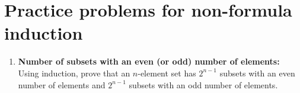 \section{Practice problems for non-formula induction}\label{practice_non_formula}

\begin{enumerate}


\item \textbf{Number of subsets with an even (or odd) number of elements:}
Using induction, prove that an $n$-element set  has $2^{n-1}$ subsets
with an even number of elements and $2^{n-1}$ subsets with an odd number
of elements.

%
%
%
%
%
%
%
%
%
%
%



\end{enumerate}
